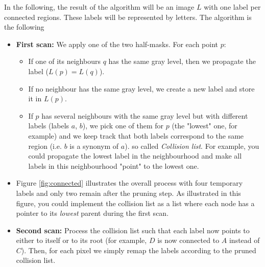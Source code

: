 \documentclass[a4paper, 11pt, french]{article}
\begin{document}
\smallskip
\par In the following, the result of the algorithm will be an image $L$ with one label per connected regions. These labels will be represented by letters. The algorithm is the following
	\begin{itemize}
	\item \textbf{First scan:} We apply one of the two half-masks. For each point $p$:
		\begin{itemize}
		\item If one of its neighbours $q$ has the same gray level, then we propagate the label ($L(p) = L(q)$).
		\item If no neighbour has the same gray level, we create a new label and store it in $L(p)$.
		\item If $p$ has several neighbours with the same gray level but with different labels (labels $a$, $b$), we pick one of them for $p$ (the "lowest" one, for example) and we keep track that both labels correspond to the same region (i.e. $b$ is a synonym of $a$). so called \emph{Collision list}. For example, you could propagate the lowest label in the neighbourhood and make all labels in this neighbourhood "point" to the lowest one.
		\end{itemize}
	\item Figure \ref{fig:connected} illustrates the overall process with four temporary labels and only two remain after the pruning step. As illustrated in this figure, you could implement the collision list as a list where each node has a pointer to its \emph{lowest} parent during the first scan.
	
	\item \textbf{Second scan:} Process the collision list such that each label now points to either to itself or to its root (for example, $D$ is now connected to $A$ instead of $C$). Then, for each pixel we simply remap the labels according to the pruned collision list.
	\end{itemize}
\end{document}
